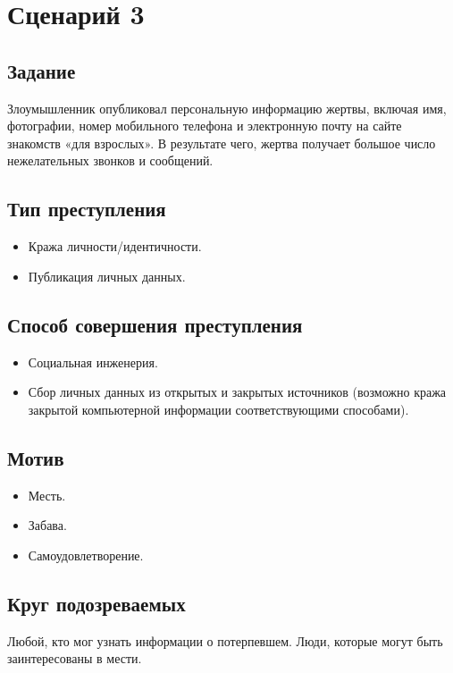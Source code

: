 \section*{Сценарий 3}

\subsection*{Задание}
Злоумышленник опубликовал персональную информацию жертвы, включая имя,
фотографии, номер мобильного телефона и электронную почту на сайте знакомств
«для взрослых». В результате чего, жертва получает большое число нежелательных
звонков и сообщений.

\subsection*{Тип преступления}
\begin{itemize}
  \item Кража личности/идентичности.
  \item Публикация личных данных.
\end{itemize}

\subsection*{Способ совершения преступления}
\begin{itemize}
  \item Социальная инженерия.
  \item Сбор личных данных из открытых и закрытых источников (возможно кража
    закрытой компьютерной информации соответствующими способами).
\end{itemize}

\subsection*{Мотив}
\begin{itemize}
  \item Месть.
  \item Забава.
  \item Самоудовлетворение.
\end{itemize}

\subsection*{Круг подозреваемых}
Любой, кто мог узнать информации о потерпевшем. Люди, которые могут быть
заинтересованы в мести.

